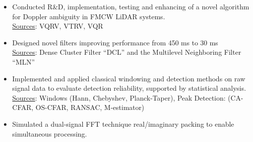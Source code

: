 \vspace{-1em}
\begin{itemize}[leftmargin=*]
 \item Conducted R\&D, implementation, testing and enhancing of a novel algorithm for Doppler ambiguity in FMCW LiDAR systems.
  \\ {\fontsize{10pt}{10pt}\selectfont\textcolor{blocktext2_color}{{\fontsize{10pt}{10pt}\selectfont\textcolor{blocktext2_color}{\href{https://amr-aboughazala.super.site/doppler-ambiguity-solution}{Sources}}}: VQRV, VTRV, VQR}}
  
\vspace{0.2em}
 
  \item Designed novel filters improving performance from 450 ms to 30 ms 
  \\ {\fontsize{10pt}{10pt}\selectfont\textcolor{blocktext2_color}{{\fontsize{10pt}{10pt}\selectfont\textcolor{blocktext2_color}{\href{https://amr-aboughazala.super.site/real-time-filtering}{Sources}}}: Dense Cluster Filter “DCL” and the Multilevel Neighboring Filter “MLN”}}
  
\vspace{0.2em}

 \item Implemented and applied classical windowing and detection methods on raw signal data to evaluate detection reliability, supported by statistical analysis. 
  \\ {\fontsize{10pt}{10pt}\selectfont\textcolor{blocktext2_color}{\href{https://amr-aboughazala.super.site/data-analysis}{Sources}: Windows (Hann, Chebyshev, Planck-Taper), Peak Detection: (CA-CFAR, OS-CFAR, RANSAC, M-estimator)}}
  
\vspace{0.2em}
  
  \item Simulated a dual-signal FFT technique real/imaginary packing to enable simultaneous processing.

\end{itemize}                
                
